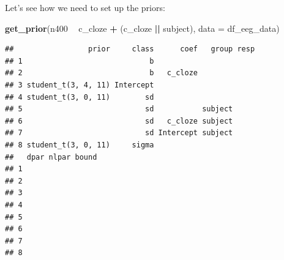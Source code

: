 \documentclass[12pt,ignorenonframetext,aspectratio=169]{beamer}
\newenvironment{Shaded}{\begin{snugshade}}{\end{snugshade}}
\newcommand{\DataTypeTok}[1]{\textcolor[rgb]{0.13,0.29,0.53}{#1}}
\newcommand{\KeywordTok}[1]{\textcolor[rgb]{0.13,0.29,0.53}{\textbf{#1}}}
\newcommand{\NormalTok}[1]{#1}
\newcommand{\OperatorTok}[1]{\textcolor[rgb]{0.81,0.36,0.00}{\textbf{#1}}}
\newcommand{\StringTok}[1]{\textcolor[rgb]{0.31,0.60,0.02}{#1}}
\begin{document}
\begin{frame}[fragile]

Let's see how we need to set up the priors:

\scriptsize

\begin{Shaded}
\begin{Highlighting}[]
\KeywordTok{get_prior}\NormalTok{(n400 }\OperatorTok{~}\StringTok{ }\NormalTok{c_cloze }\OperatorTok{+}\StringTok{ }\NormalTok{(c_cloze }\OperatorTok{||}\StringTok{ }\NormalTok{subject), }\DataTypeTok{data =}\NormalTok{ df_eeg_data)}
\end{Highlighting}
\end{Shaded}

\begin{verbatim}
##                 prior     class      coef   group resp
## 1                             b                       
## 2                             b   c_cloze             
## 3 student_t(3, 4, 11) Intercept                       
## 4 student_t(3, 0, 11)        sd                       
## 5                            sd           subject     
## 6                            sd   c_cloze subject     
## 7                            sd Intercept subject     
## 8 student_t(3, 0, 11)     sigma                       
##   dpar nlpar bound
## 1                 
## 2                 
## 3                 
## 4                 
## 5                 
## 6                 
## 7                 
## 8
\end{verbatim}

\normalsize

\end{frame}
\end{document}
